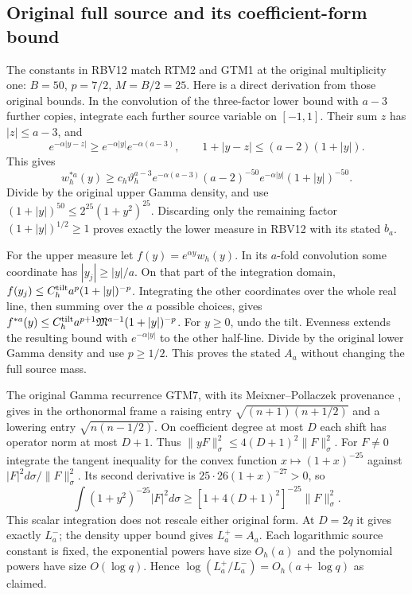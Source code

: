 \subsection{Original full source and its coefficient-form bound}

The constants in RBV12 match RTM2 and GTM1 at the original
multiplicity one: $B=50$, $p=7/2$, $M=B/2=25$.
Here is a direct derivation from those original bounds.
In the convolution of the three-factor lower bound with $a-3$
further copies, integrate each further source variable on $[-1,1]$.
Their sum $z$ has $|z|\le a-3$, and
\[
 e^{-\alpha|y-z|}\ge e^{-\alpha|y|}e^{-\alpha(a-3)},\qquad
 1+|y-z|\le(a-2)(1+|y|).
\]
This gives
\[
 w_h^{*a}(y)\ge
 c_h\vartheta_h^{a-3}e^{-\alpha(a-3)}(a-2)^{-50}
 e^{-\alpha|y|}(1+|y|)^{-50}.
\]
Divide by the original upper Gamma density, and use
$(1+|y|)^{50}\le2^{25}(1+y^2)^{25}$.
Discarding only the remaining factor $(1+|y|)^{1/2}\ge1$
proves exactly the lower measure in RBV12 with its stated $b_a$.

For the upper measure let $f(y)=e^{\alpha y}w_h(y)$.
In its $a$-fold convolution some coordinate has
$|y_j|\ge|y|/a$.  On that part of the integration domain,
$f(y_j)\le C_h^{\rm tilt}a^p(1+|y|)^{-p}$.
Integrating the other coordinates over the whole real line,
then summing over the $a$ possible choices, gives
$f^{*a}(y)\le C_h^{\rm tilt}a^{p+1}\mathfrak M^{a-1}
(1+|y|)^{-p}$.
For $y\ge0$, undo the tilt.  Evenness extends the resulting
bound with $e^{-\alpha|y|}$ to the other half-line.
Divide by the original lower Gamma density and use
$p\ge1/2$.  This proves the stated $A_a$ without changing the
full source mass.

The original Gamma recurrence GTM7, with its
Meixner--Pollaczek provenance \cite{human:dlmf18}, gives in the
orthonormal frame a raising entry
$\sqrt{(n+1)(n+1/2)}$ and a lowering entry
$\sqrt{n(n-1/2)}$.
On coefficient degree at most $D$ each shift has operator norm
at most $D+1$.  Thus
$\|yF\|_\sigma^2\le4(D+1)^2\|F\|_\sigma^2$.
For $F\ne0$ integrate the tangent inequality for the convex
function $x\mapsto(1+x)^{-25}$ against
$|F|^2d\sigma/\|F\|_\sigma^2$.  Its second derivative is
$25\cdot26(1+x)^{-27}>0$, so
\[
 \int(1+y^2)^{-25}|F|^2d\sigma
 \ge[1+4(D+1)^2]^{-25}\|F\|_\sigma^2 .
 \tag{RBR7}
\]
This scalar integration does not rescale either original form.
At $D=2q$ it gives exactly $L_a^-$; the density upper bound gives
$L_a^+=A_a$.  Each logarithmic source constant is fixed, the
exponential powers have size $O_h(a)$ and the polynomial powers
have size $O(\log q)$.  Hence
$\log(L_a^+/L_a^-)=O_h(a+\log q)$ as claimed.

